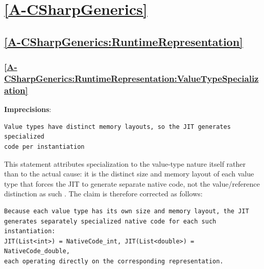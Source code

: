 \documentclass[11pt]{report}
\begin{document}
\section*{\hyperref[A-CSharpGenerics]{\ref*{A-CSharpGenerics} }}

\subsection*{\hyperref[A-CSharpGenerics:RuntimeRepresentation]{\ref*{A-CSharpGenerics:RuntimeRepresentation} }}

\subsubsection*{\hyperref[A-CSharpGenerics:RuntimeRepresentation:ValueTypeSpecialization]{\ref*{A-CSharpGenerics:RuntimeRepresentation:ValueTypeSpecialization} }}
\noindent\textbf{Imprecisions}:

\begin{Verbatim}[breaklines=true]
Value types have distinct memory layouts, so the JIT generates specialized
code per instantiation
\end{Verbatim}

This statement attributes specialization to the value-type nature itself
rather than to the actual cause: it is the distinct size and memory layout
of each value type that forces the JIT to generate separate native code,
not the value/reference distinction as such \cite{kennedy2001}. The claim
is therefore corrected as follows:

\begin{Verbatim}[breaklines=true]
Because each value type has its own size and memory layout, the JIT
generates separately specialized native code for each such instantiation:
JIT(List<int>) = NativeCode_int, JIT(List<double>) = NativeCode_double,
each operating directly on the corresponding representation.
\end{Verbatim}
\end{document}
